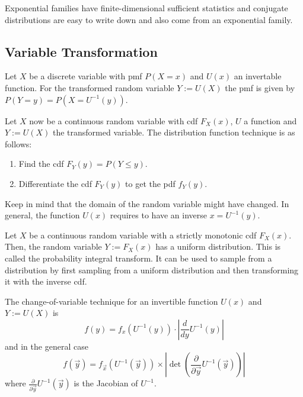 Exponential families have finite-dimensional sufficient statistics
and conjugate distributions are easy to write down and also come
from an exponential family.


\subsection{Variable Transformation}
Let $X$ be a discrete variable with pmf $P(X = x)$ and
$U(x)$ an invertable function.
For the transformed random variable $Y := U(X)$ the pmf is given by
$P(Y = y) = P(X = U^{-1}(y))$.

Let $X$ now be a continuous random variable with cdf $F_X(x)$,
$U$ a function and $Y := U(X)$ the transformed variable.
The distribution function technique is as follows:
\begin{enumerate}
    \item Find the cdf $F_Y(y) = P(Y \leq y)$.
    \item Differentiate the cdf $F_Y(y)$ to get the pdf $f_Y(y)$.
\end{enumerate}
Keep in mind that the domain of the random variable might have changed.
In general, the function $U(x)$ requires to have an inverse
$x = U^{-1}(y)$.

Let $X$ be a continuous random variable with a strictly monotonic cdf
$F_X(x)$. Then, the random variable $Y := F_X(x)$ has a uniform distribution.
This is called the probability integral transform.
It can be used to sample from a distribution by first sampling from
a uniform distribution and then transforming it with the inverse cdf.

The change-of-variable technique for an invertible function $U(x)$
and $Y := U(X)$ is
\begin{equation*}
    f(y) = f_x(U^{-1}(y)) \cdot \left| \frac{d}{dy}U^{-1}(y) \right|
\end{equation*}
and in the general case
\begin{equation*}
    f(\vec{y}) = f_{\vec{x}} (U^{-1}(\vec{y})) \times
    \left| \det\left( \frac{\partial}{\partial \vec{y}}
    U^{-1}(\vec{y}) \right) \right|
\end{equation*}
where $\frac{\partial}{\partial \vec{y}}U^{-1}(\vec{y})$
is the Jacobian of $U^{-1}$.
